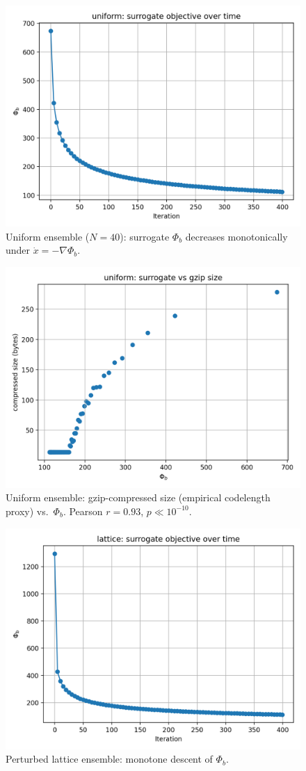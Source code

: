 \documentclass[11pt]{article}
\begin{document}
\begin{figure}[h!]
  \centering
  \includegraphics[width=0.7\linewidth]{figures/uniform_phib_vs_iter.png}
  \caption{Uniform ensemble ($N{=}40$): surrogate $\Phi_b$ decreases monotonically under $\dot{x}=-\nabla\Phi_b$.}
  \label{fig:uniform_iter}
\end{figure}

\begin{figure}[h!]
  \centering
  \includegraphics[width=0.7\linewidth]{figures/uniform_phib_vs_compressed.png}
  \caption{Uniform ensemble: gzip-compressed size (empirical codelength proxy) vs.\ $\Phi_b$. Pearson $r{=}0.93$, $p{\ll}10^{-10}$.}
  \label{fig:uniform_corr}
\end{figure}

\begin{figure}[h!]
  \centering
  \includegraphics[width=0.7\linewidth]{figures/lattice_phib_vs_iter.png}
  \caption{Perturbed lattice ensemble: monotone descent of $\Phi_b$.}
  \label{fig:lattice_iter}
\end{figure}
\end{document}
